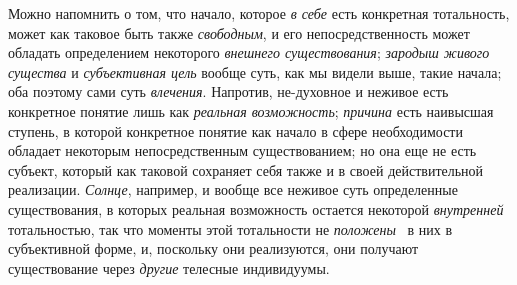 \documentclass[twoside]{article}
\begin{document}
Можно напомнить о том, что начало, которое
{\em в себе} есть
конкретная тотальность, может как таковое быть также
{\em свободным}, и его
непосредственность может обладать определением некоторого
{\em внешнего существования};
{\em зародыш живого существа}
и {\em субъективная цель}
вообще суть, как мы видели выше, такие начала; оба поэтому
сами суть {\em влечения}.
Напротив, не-духовное и неживое есть конкретное понятие лишь
как {\em реальная возможность};
{\em причина} есть
наивысшая ступень, в которой конкретное понятие как начало в сфере
необходимости обладает некоторым непосредственным существованием; но она
еще не есть субъект, который как таковой сохраняет себя также и в своей
действительной реализации.
{\em Солнце}, например, и
вообще все неживое суть определенные существования, в которых реальная
возможность остается некоторой
{\em внутренней}
тотальностью, так что моменты этой тотальности не
{\em положены}~\label{bkm:bm122}
в них в субъективной форме, и, поскольку они реализуются, они
получают существование через
{\em другие} телесные
индивидуумы.
\end{document}
